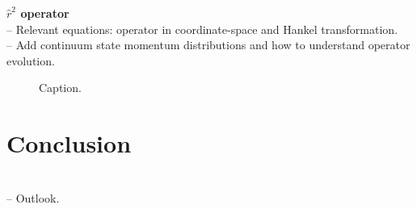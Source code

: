 \documentclass[preprintnumbers,floatfix,aps,prc,preprint,nofootinbib]{revtex4-1}
\begin{document}
%
\textbf{$\hat{r}^2$ operator}
\\
-- Relevant equations: operator in coordinate-space and Hankel transformation.
\\
-- Add continuum state momentum distributions and how to understand operator evolution.
%
\begin{figure}[H]
	\centering
	
	\caption{Caption.}
	\label{fig:r2_contours_RKE}
\end{figure}
%


\section{Conclusion}
\label{sec:conclusion}


\\
-- Outlook.





\end{document}

